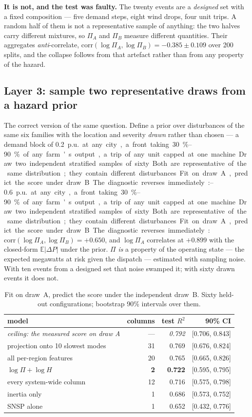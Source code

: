 \documentclass[11pt,a4paper]{article}
\newcommand{\Rtwo}{\ensuremath{R^{2}}}
\begin{document}
\textbf{It is not, and the test was faulty.} The twenty events are a
\emph{designed} set with a fixed composition --- five demand steps, eight wind
drops, four unit trips. A random half of them is not a representative sample
of anything: the two halves carry different mixtures, so $\Pi_A$ and $\Pi_B$
measure different quantities. Their aggregates \emph{anti}-correlate,
$\mathrm{corr}(\log\Pi_A,\log\Pi_B) = -0.385 \pm 0.109$ over 200 splits, and
the collapse follows from that artefact rather than from any property of the
hazard.

\subsection*{Layer 3: sample two representative draws from a hazard prior}
The correct version of the same question. Define a prior over disturbances of
the same six families with the location and severity \emph{drawn} rather than
chosen --- a demand block of \SIrange{0.2}{0.6}{p.u.} at any city, a front
taking \SIrange{30}{90}{\percent} of any farm's output, a trip of any unit
capped at one machine. Draw two independent stratified samples of sixty.
Both are representative of the same distribution; they contain different
disturbances. Fit on draw~A, predict the score under draw~B.

The diagnostic reverses immediately:
$\mathrm{corr}(\log\Pi_A,\log\Pi_B) = +0.650$, and $\log\Pi_A$ correlates at
$+0.899$ with the closed-form $\mathbb{E}|\Delta P|$ under the prior. $\Pi$
\emph{is} a property of the operating state --- the expected megawatts at risk
given the dispatch --- estimated with sampling noise. With ten events from a
designed set that noise swamped it; with sixty drawn events it does not.

\begin{table}[h]
\centering
\small
\caption{Fit on draw~A, predict the score under the independent draw~B.
Sixty held-out configurations; bootstrap 90\% intervals over them.}
\begin{tabular}{lrrr}
\toprule
model & columns & test \Rtwo & 90\% CI \\
\midrule
\emph{ceiling: the measured score on draw A} & --- & \emph{0.792} & [0.706, 0.843] \\
\midrule
projection onto 10 slowest modes & 31 & 0.769 & [0.676, 0.824] \\
all per-region features          & 20 & 0.765 & [0.665, 0.826] \\
\rowcolor{gray!12}
$\log\Pi + \log H$               & \textbf{2} & \textbf{0.722} & [0.595, 0.795] \\
every system-wide column         & 12 & 0.716 & [0.575, 0.798] \\
inertia only                     & 1  & 0.686 & [0.573, 0.752] \\
SNSP alone                       & 1  & 0.652 & [0.432, 0.776] \\
\bottomrule
\end{tabular}
\label{tab:draw}
\end{table}
\end{document}
